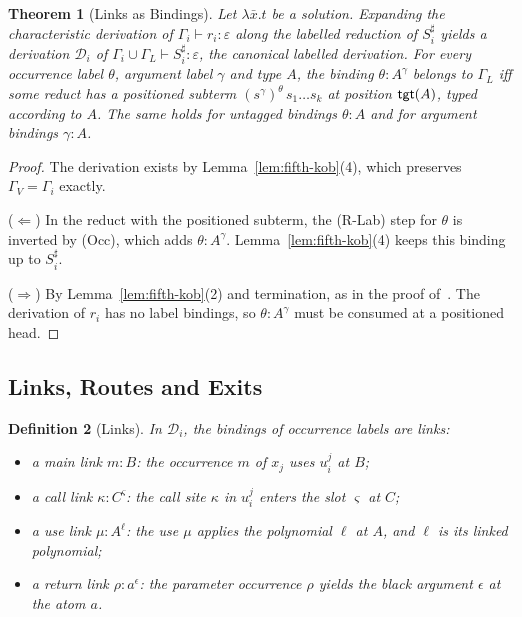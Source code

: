 \documentclass[10pt,a4paper]{article}
\theoremstyle{plain}%
\newtheorem{theorem}{Theorem}
\newtheorem{definition}[theorem]{Definition}
\begin{document}
\begin{theorem}[Links as Bindings]\label{thm:fifth-links}
Let $\lambda\bar x.t$ be a solution.
Expanding the characteristic derivation of $\Gamma_i \vdash r_i : \varepsilon$ along the labelled reduction of $S_i^\sharp$ yields a derivation $\mathcal{D}_i$ of $\Gamma_i \cup \Gamma_L \vdash S_i^\sharp : \varepsilon$, the \emph{canonical labelled derivation}.
For every occurrence label $\theta$, argument label $\gamma$ and type $A$, the binding $\theta : A^\gamma$ belongs to $\Gamma_L$ iff some reduct has a positioned subterm $(s^\gamma)^\theta\,s_1\ldots s_k$ at position $\mathsf{tgt}(A)$, typed according to $A$.
The same holds for untagged bindings $\theta : A$ and for argument bindings $\gamma : A$.
\end{theorem}

\begin{proof}
The derivation exists by Lemma~\ref{lem:fifth-kob}(4), which preserves $\Gamma_V = \Gamma_i$ exactly.

($\Leftarrow$)
In the reduct with the positioned subterm, the (R-Lab) step for $\theta$ is inverted by (Occ), which adds $\theta : A^\gamma$.
Lemma~\ref{lem:fifth-kob}(4) keeps this binding up to $S_i^\sharp$.

($\Rightarrow$)
By Lemma~\ref{lem:fifth-kob}(2) and termination, as in the proof of~\cite[Theorem~3.6]{Kobayashi13}.
The derivation of $r_i$ has no label bindings, so $\theta : A^\gamma$ must be consumed at a positioned head.
\end{proof}

\subsection{Links, Routes and Exits}

\begin{definition}[Links]
In $\mathcal{D}_i$, the bindings of occurrence labels are \emph{links}:
\begin{itemize}
\item a \emph{main link} $m : B$: the occurrence $m$ of $x_j$ uses $u_i^j$ at $B$;
\item a \emph{call link} $\kappa : C^\varsigma$: the call site $\kappa$ in $u_i^j$ enters the slot $\varsigma$ at $C$;
\item a \emph{use link} $\mu : A^\ell$: the use $\mu$ applies the polynomial $\ell$ at $A$, and $\ell$ is its \emph{linked polynomial};
\item a \emph{return link} $\rho : a^\epsilon$: the parameter occurrence $\rho$ yields the black argument $\epsilon$ at the atom $a$.
\end{itemize}
\end{definition}
\end{document}
